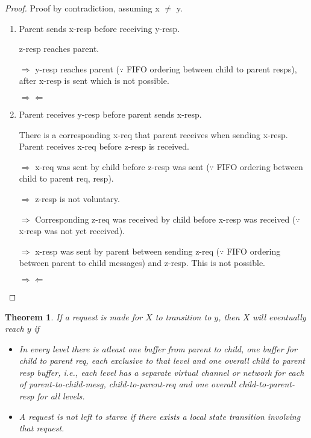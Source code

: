 \documentclass{article}
\newtheorem{theorem}{Theorem}
\begin{document}
\begin{proof}

Proof by contradiction, assuming x $\neq$ y.

\begin{enumerate}
\item Parent sends x-resp before receiving y-resp.

z-resp reaches parent.

\begin{figure}
\centering
\end{figure}

$\Rightarrow$ y-resp reaches parent ($\because$ FIFO ordering between child to parent resps), after x-resp is sent which is not possible.

$\Rightarrow \Leftarrow$

\item Parent receives y-resp before parent sends x-resp.

\begin{figure}
\centering
\end{figure}

There is a corresponding x-req that parent receives when sending x-resp. Parent receives x-req before z-resp is received.

$\Rightarrow$ x-req was sent by child before z-resp was sent ($\because$ FIFO ordering between child to parent req, resp).

$\Rightarrow$ z-resp is not voluntary.

$\Rightarrow$ Corresponding z-req was received by child before x-resp was received ($\because$ x-resp was not yet received).

$\Rightarrow$ x-resp was sent by parent between sending z-req ($\because$ FIFO ordering between parent to child messages) and z-resp. This is not possible.

$\Rightarrow \Leftarrow$

\end{enumerate}

\end{proof}


\begin{theorem}
If a request is made for $X$ to transition to $y$, then $X$ will eventually reach $y$ if
\begin{itemize}
\item In every level there is atleast one buffer from parent to child, one buffer for child to parent req, each exclusive to that level and one overall child to parent resp buffer, i.e., each level has a separate virtual channel or network for each of parent-to-child-mesg, child-to-parent-req and one overall child-to-parent-resp for all levels.
\item A request is not left to starve if there exists a local state transition involving that request.
\end{itemize}
\end{theorem}
\end{document}
